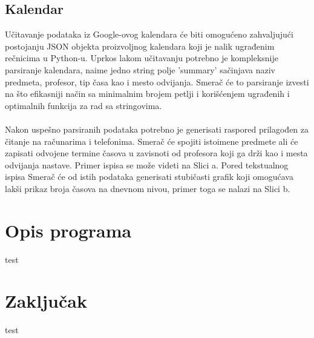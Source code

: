 \documentclass[a4paper,11pt]{article}
\begin{document}
\subsection{Kalendar}
Učitavanje podataka iz Google-ovog kalendara će biti omogućeno zahvaljujući postojanju JSON objekta proizvoljnog kalendara koji je nalik ugrađenim rečnicima u Python-u. Uprkos lakom učitavanju potrebno je kompleksnije parsiranje kalendara, naime jedno string polje 'summary' sačinjava naziv predmeta, profesor, tip časa kao i mesto odvijanja. Smerač će to parsiranje izvesti na što efikasniji način sa minimalnim brojem petlji i korišćenjem ugrađenih i optimalnih funkcija za rad sa stringovima.
\\\\
Nakon uspešno parsiranih podataka potrebno je generisati raspored prilagođen za čitanje na računarima i telefonima. Smerač će spojiti istoimene predmete ali će zapisati odvojene termine časova u zavisnoti od profesora koji ga drži kao i mesta odvijanja nastave. Primer ispisa se može videti na Slici a. Pored tekstualnog ispisa Smerač će od istih podataka generisati stubičasti grafik koji omogućava lakši prikaz broja časova na dnevnom nivou, primer toga se nalazi na Slici b.
\begin{figure}[h]
    \centering
    \hspace{1cm}
\end{figure}
\newpage

\section{Opis programa}
test
\newpage

\section{Zaključak}
test
\newpage

\pagestyle{plain}
\renewcommand\refname{Literatura}


\end{document}
